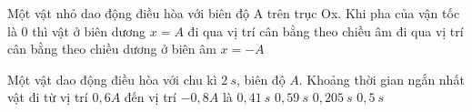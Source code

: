 	\begin{ex}%
		Một vật nhỏ dao động điều hòa với biên độ A trên trục Ox. Khi pha của vận tốc là $0$ thì vật
		\choice
		{ở biên dương $x = A$}
		{đi qua vị trí cân bằng theo chiều âm}
		{\True đi qua vị trí cân bằng theo chiều dương}
		{ở biên âm $x = -A$}
	\end{ex}
	\begin{ex}%
		Một vật dao động điều hòa với chu kì $2\ s$, biên độ $A$. Khoảng thời gian ngắn nhất vật đi từ vị trí $0,6A$ đến vị trí $-0,8A$ là
		\choice
		{$0,41\ s$}
		{$0,59\ s$}
		{$0,205\ s$}
		{\True $0,5\ s$}
		
	\end{ex}
	
